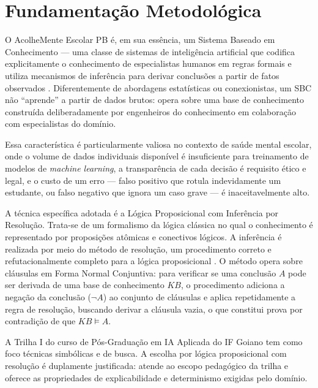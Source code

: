 \documentclass[
    12pt,
    openright,
    oneside,
    a4paper,
    english,
    brazil
]{abntex2}
\begin{document}
\chapter{Fundamenta\c{c}\~ao Metodol\'ogica}

O AcolheMente Escolar PB \'e, em sua ess\^encia, um Sistema Baseado em Conhecimento --- uma classe de sistemas de intelig\^encia artificial que codifica explicitamente o conhecimento de especialistas humanos em regras formais e utiliza mecanismos de infer\^encia para derivar conclus\~oes a partir de fatos observados \cite{brachman_levesque_2004}. Diferentemente de abordagens estat\'isticas ou conexionistas, um SBC n\~ao ``aprende'' a partir de dados brutos: opera sobre uma base de conhecimento constru\'ida deliberadamente por engenheiros do conhecimento em colabora\c{c}\~ao com especialistas do dom\'inio.

Essa caracter\'istica \'e particularmente valiosa no contexto de sa\'ude mental escolar, onde o volume de dados individuais dispon\'ivel \'e insuficiente para treinamento de modelos de \textit{machine learning}, a transpar\^encia de cada decis\~ao \'e requisito \'etico e legal, e o custo de um erro --- falso positivo que rotula indevidamente um estudante, ou falso negativo que ignora um caso grave --- \'e inaceitavelmente alto.

A t\'ecnica espec\'ifica adotada \'e a L\'ogica Proposicional com Infer\^encia por Resolu\c{c}\~ao. Trata-se de um formalismo da l\'ogica cl\'assica no qual o conhecimento \'e representado por proposi\c{c}\~oes at\^omicas e conectivos l\'ogicos. A infer\^encia \'e realizada por meio do m\'etodo de resolu\c{c}\~ao, um procedimento correto e refutacionalmente completo para a l\'ogica proposicional \cite{genesereth_nilsson_1987}. O m\'etodo opera sobre cl\'ausulas em Forma Normal Conjuntiva: para verificar se uma conclus\~ao $A$ pode ser derivada de uma base de conhecimento $KB$, o procedimento adiciona a nega\c{c}\~ao da conclus\~ao ($\neg A$) ao conjunto de cl\'ausulas e aplica repetidamente a regra de resolu\c{c}\~ao, buscando derivar a cl\'ausula vazia, o que constitui prova por contradi\c{c}\~ao de que $KB \models A$.

A Trilha I do curso de P\'os-Gradua\c{c}\~ao em IA Aplicada do IF Goiano tem como foco t\'ecnicas simb\'olicas e de busca. A escolha por l\'ogica proposicional com resolu\c{c}\~ao \'e duplamente justificada: atende ao escopo pedag\'ogico da trilha e oferece as propriedades de explicabilidade e determinismo exigidas pelo dom\'inio.
\end{document}
